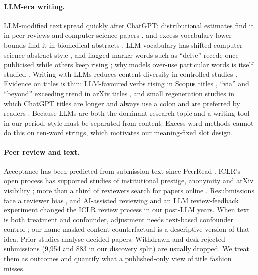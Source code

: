 \paragraph{LLM-era writing.}
LLM-modified text spread quickly after ChatGPT: distributional estimates find it in peer reviews \citep{liang2024monitoring} and computer-science papers \citep{liang2025quantifying}, and excess-vocabulary lower bounds find it in biomedical abstracts \citep{kobak2025delving}. LLM vocabulary has shifted computer-science abstract style \citep{geng2024chatgpt}, and flagged marker words such as ``delve'' recede once publicised while others keep rising \citep{geng2025coevolution}; why models over-use particular words is itself studied \citep{juzek2025delve}. Writing with LLMs reduces content diversity in controlled studies \citep{padmakumar2024writing,sourati2026shrinking}. Evidence on titles is thin: LLM-favoured verbs rising in Scopus titles \citep{comas2025ai}, ``via'' and ``beyond'' exceeding trend in arXiv titles \citep{geng2026beyond}, and small regeneration studies in which ChatGPT titles are longer and always use a colon \citep{sebo2026chatgpt} and are preferred by readers \citep{sebo2025better}. Because LLMs are both the dominant research topic and a writing tool in our period, style must be separated from content. Excess-word methods cannot do this on ten-word strings, which motivates our meaning-fixed slot design.

\paragraph{Peer review and text.}
Acceptance has been predicted from submission text since PeerRead \citep{kang2018peerread}. ICLR's open process has supported studies of institutional prestige, anonymity and arXiv visibility \citep{tran2020open,bharadhwaj2020deanonymization,sun2022double,elazar2024arxiving}; more than a third of reviewers search for papers online \citep{rastogi2022arxiv}. Resubmissions face a reviewer bias \citep{stelmakh2021prior}, and AI-assisted reviewing \citep{latona2024lottery} and an LLM review-feedback experiment \citep{thakkar2025feedback} changed the ICLR review process in our post-LLM years. When text is both treatment and confounder, adjustment needs text-based confounder control \citep{keith2020text,pryzant2021causal,feder2022causal,egami2022causal}; our name-masked content counterfactual is a descriptive version of that idea. Prior studies analyse decided papers. Withdrawn and desk-rejected submissions (9,954 and 883 in our discovery split) are usually dropped. %
We treat them as outcomes and quantify what a published-only view of title fashion misses.
